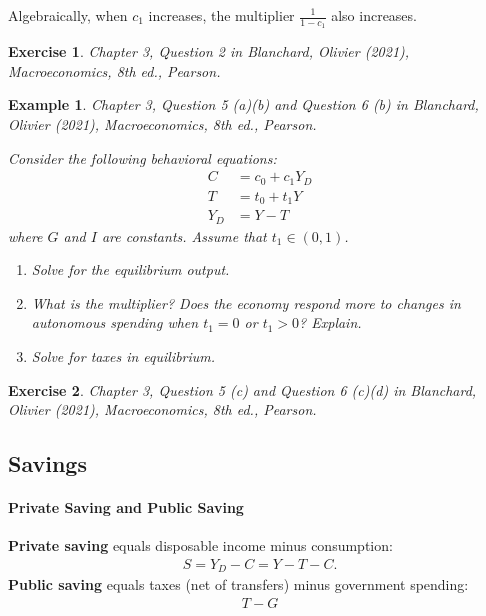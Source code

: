 \documentclass[12pt]{article}
\newtheorem{example}{Example}
\newtheorem{exercise}{Exercise}
\begin{document}
Algebraically, when $c_1$ increases, the multiplier $\frac{1}{1-c_1}$ also increases.

\begin{exercise}
    Chapter 3, Question 2 in Blanchard, Olivier (2021), \textit{Macroeconomics}, 8th ed., Pearson.
\end{exercise}

\begin{example}
    Chapter 3, Question 5 (a)(b) and Question 6 (b) in Blanchard, Olivier (2021), \textit{Macroeconomics}, 8th ed., Pearson.

    Consider the following behavioral equations:
    \begin{align*}
        C &= c_0 + c_1Y_D\\
        T &= t_0 + t_1Y\\
        Y_D &= Y-T
    \end{align*}
    where $G$ and $I$ are constants. Assume that $t_1\in(0,1)$.
    \begin{enumerate}[label=\alph*.]
        \item Solve for the equilibrium output.
        \item What is the multiplier? Does the economy respond more to changes in autonomous spending when $t_1=0$ or $t_1>0$? Explain.
        \item Solve for taxes in equilibrium.
    \end{enumerate}
\end{example}

\vspace{36pt}

\begin{exercise}
    Chapter 3, Question 5 (c) and Question 6 (c)(d) in Blanchard, Olivier (2021), \textit{Macroeconomics}, 8th ed., Pearson.
\end{exercise}

\subsection*{Savings}
\paragraph{Private Saving and Public Saving}
\textbf{Private saving} equals disposable income minus consumption:
\begin{align}\label{eq:def_priv_s}
    S = Y_D - C = Y - T - C.
\end{align}
\textbf{Public saving} equals taxes (net of transfers) minus government spending:
\begin{align*}
    T - G
\end{align*}
\end{document}
